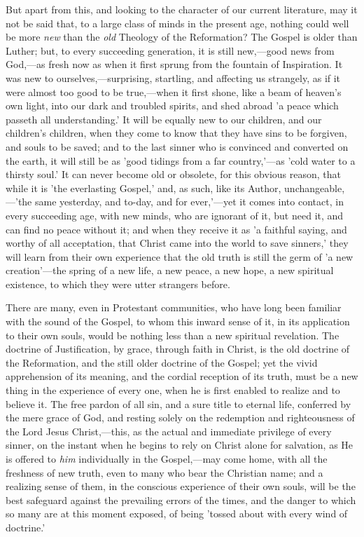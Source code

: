 \documentclass[
]{book}
\begin{document}
But apart from this, and looking to the character of our current literature, may it not be said that, to a large class of minds in the present age, nothing could well be more \emph{new} than the \emph{old} Theology of the Reformation? The Gospel is older than Luther; but, to every succeeding generation, it is still new,---good news from God,---as fresh now as when it first sprung from the fountain of Inspiration. It was new to ourselves,---surprising, startling, and affecting us strangely, as if it were almost too good to be true,---when it first shone, like a beam of heaven's own light, into our dark and troubled spirits, and shed abroad 'a peace which passeth all understanding.' It will be equally new to our children, and our children's children, when they come to know that they have sins to be forgiven, and souls to be saved; and to the last sinner who is convinced and converted on the earth, it will still be as 'good tidings from a far country,'---as 'cold water to a thirsty soul.' It can never become old or obsolete, for this obvious reason, that while it is 'the everlasting Gospel,' and, as such, like its Author, unchangeable,---'the same yesterday, and to-day, and for ever,'---yet it comes into contact, in every succeeding age, with new minds, who are ignorant of it, but need it, and can find no peace without it; and when they receive it as 'a faithful saying, and worthy of all acceptation, that Christ came into the world to save sinners,' they will learn from their own experience that the old truth is still the germ of 'a new creation'---the spring of a new life, a new peace, a new hope, a new spiritual existence, to which they were utter strangers before.

There are many, even in Protestant communities, who have long been familiar with the sound of the Gospel, to whom this inward sense of it, in its application to their own souls, would be nothing less than a new spiritual revelation. The doctrine of Justification, by grace, through faith in Christ, is the old doctrine of the Reformation, and the still older doctrine of the Gospel; yet the vivid apprehension of its meaning, and the cordial reception of its truth, must be a new thing in the experience of every one, when he is first enabled to realize and to believe it. The free pardon of all sin, and a sure title to eternal life, conferred by the mere grace of God, and resting solely on the redemption and righteousness of the Lord Jesus Christ,---this, as the actual and immediate privilege of every sinner, on the instant when he begins to rely on Christ alone for salvation, as He is offered to \emph{him} individually in the Gospel,---may come home, with all the freshness of new truth, even to many who bear the Christian name; and a realizing sense of them, in the conscious experience of their own souls, will be the best safeguard against the prevailing errors of the times, and the danger to which so many are at this moment exposed, of being 'tossed about with every wind of doctrine.'
\end{document}
